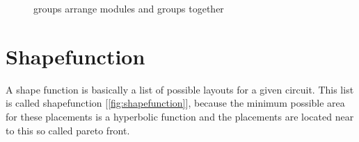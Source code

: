 \begin{figure}
	\centering
	\caption{groups arrange modules and groups together}
\end{figure}

\section{Shapefunction}
A shape function is basically a list of possible layouts for a given circuit. This list is called shapefunction [\ref{fig:shapefunction}], because the minimum possible area for these placements is a hyperbolic function and the placements are located near to this so called pareto front.

